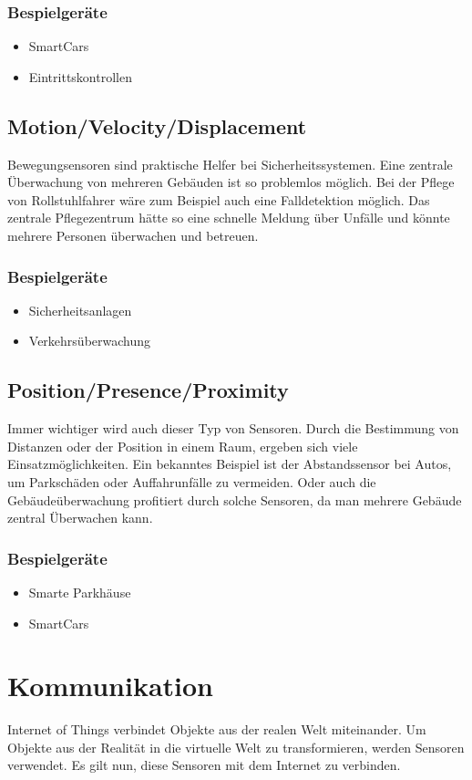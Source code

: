 \subsubsection{Bespielgeräte}
\begin{itemize}
\item	SmartCars
\item	Eintrittskontrollen
\end{itemize}


\subsection{Motion/Velocity/Displacement}%
Bewegungsensoren sind praktische Helfer bei Sicherheitssystemen. Eine zentrale Überwachung von mehreren Gebäuden ist so problemlos möglich. Bei der Pflege von Rollstuhlfahrer wäre zum Beispiel auch eine Falldetektion möglich. Das zentrale Pflegezentrum hätte so eine schnelle Meldung über Unfälle und könnte mehrere Personen überwachen und betreuen.
\subsubsection{Bespielgeräte}
\begin{itemize}
\item	Sicherheitsanlagen
\item	Verkehrsüberwachung
\end{itemize}


\subsection{Position/Presence/Proximity}%
Immer wichtiger wird auch dieser Typ von Sensoren. Durch die Bestimmung von Distanzen oder der Position in einem Raum, ergeben sich viele Einsatzmöglichkeiten. Ein bekanntes Beispiel ist der Abstandssensor bei Autos, um Parkschäden oder Auffahrunfälle zu vermeiden. Oder auch die Gebäudeüberwachung profitiert durch solche Sensoren, da man mehrere Gebäude zentral Überwachen kann.
\subsubsection{Bespielgeräte}
\begin{itemize}
\item	Smarte Parkhäuse
\item	SmartCars
\end{itemize}


\section{Kommunikation}
Internet of Things verbindet Objekte aus der realen Welt miteinander. Um Objekte aus der Realität in die virtuelle Welt zu transformieren, werden Sensoren verwendet. Es gilt nun, diese Sensoren mit dem Internet zu verbinden.

